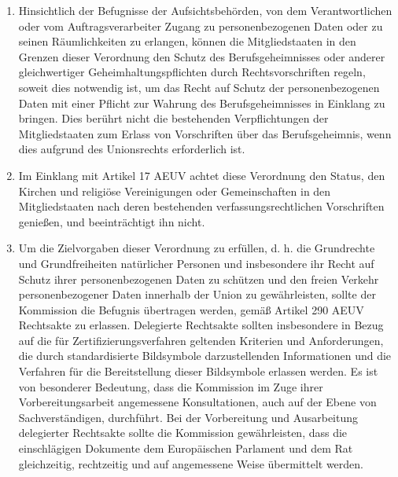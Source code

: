 \begin{enumerate}

   \item Hinsichtlich der Befugnisse der Aufsichtsbehörden, von dem Verantwortlichen oder vom Auftragsverarbeiter Zugang
    zu personenbezogenen Daten oder zu seinen Räumlichkeiten zu erlangen, können die Mitgliedstaaten in den Grenzen
    dieser Verordnung den Schutz des Berufsgeheimnisses oder anderer gleichwertiger Geheimhaltungspflichten durch
    Rechtsvorschriften regeln, soweit dies notwendig ist, um das Recht auf Schutz der personenbezogenen Daten mit einer
    Pflicht zur Wahrung des Berufsgeheimnisses in Einklang zu bringen. Dies berührt nicht die bestehenden
    Verpflichtungen der Mitgliedstaaten zum Erlass von Vorschriften über das Berufsgeheimnis, wenn dies aufgrund des
    Unionsrechts erforderlich ist.%
   \label{itm:eg-164}
   

   \item Im Einklang mit Artikel 17 AEUV achtet diese Verordnung den Status, den Kirchen und religiöse Vereinigungen
    oder Gemeinschaften in den Mitgliedstaaten nach deren bestehenden verfassungsrechtlichen Vorschriften genießen, und
    beeinträchtigt ihn nicht.%
   \label{itm:eg-165}
   

   \item Um die Zielvorgaben dieser Verordnung zu erfüllen, d. h. die Grundrechte und Grundfreiheiten natürlicher
    Personen und insbesondere ihr Recht auf Schutz ihrer personenbezogenen Daten zu schützen und den freien Verkehr
    personenbezogener Daten innerhalb der Union zu gewährleisten, sollte der Kommission die Befugnis übertragen werden,
    gemäß Artikel 290 AEUV Rechtsakte zu erlassen. Delegierte Rechtsakte sollten insbesondere in Bezug auf die für
    Zertifizierungsverfahren geltenden Kriterien und Anforderungen, die durch standardisierte Bildsymbole
    darzustellenden Informationen und die Verfahren für die Bereitstellung dieser Bildsymbole erlassen werden. Es ist
    von besonderer Bedeutung, dass die Kommission im Zuge ihrer Vorbereitungsarbeit angemessene Konsultationen, auch
    auf der Ebene von Sachverständigen, durchführt. Bei der Vorbereitung und Ausarbeitung delegierter Rechtsakte sollte
    die Kommission gewährleisten, dass die einschlägigen Dokumente dem Europäischen Parlament und dem Rat gleichzeitig,
    rechtzeitig und auf angemessene Weise übermittelt werden.%
   \label{itm:eg-166}
   

\end{enumerate}
